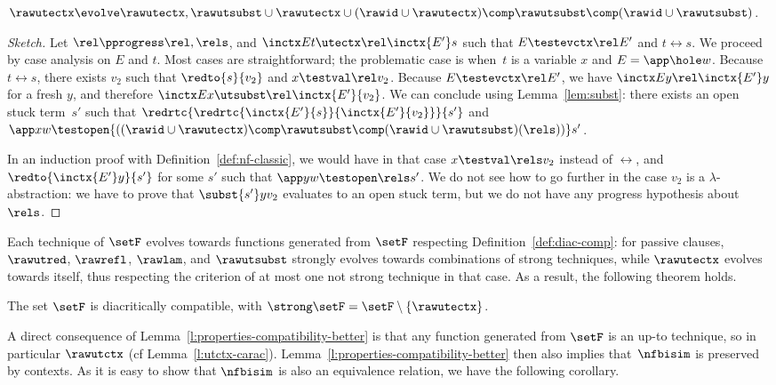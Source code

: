 \documentclass{lmcs}
\theoremstyle{defC}
\begin{document}
\begin{lem}%
  \label{l:app-lambda}
  $\rawutectx \evolve \rawutectx, \rawutsubst \cup \rawutectx \cup
  (\rawid \cup \rawutectx) \comp \rawutsubst \comp (\rawid \cup \rawutsubst)$.
\end{lem}

\begin{proof}[Sketch]
Let $\rel \pprogress \rel, \rels$, and $\inctx E t \utectx\rel
\inctx {E'} s$ such that $E \testevctx\rel E'$ and $t \rel s$.  We proceed by
case analysis on $E$ and $t$. Most cases are straightforward; the problematic
case is when~$t$ is a variable $x$ and $E = \app \hole w$. Because $t \rel s$,
there exists $v_2$ such that $\redto{s}{v_2}$ and $x \testval\rel v_2$. Because
$E \testevctx\rel E'$, we have $\inctx E y \rel \inctx {E'} y$ for a fresh $y$,
and therefore $\inctx E x \utsubst\rel \inctx {E'}{v_2}$. We can conclude using
Lemma~\ref{lem:subst}: there exists an open stuck term~$s'$ such that
$\redrtc{\redrtc{\inctx{E'}{s}}{\inctx{E'}{v_2}}}{s'}$ and $\app x w
\testopen{((\rawid \cup \rawutectx) \comp \rawutsubst \comp (\rawid \cup
  \rawutsubst)(\rels))} s'$.

In an induction proof with Definition~\ref{def:nf-classic}, we would have in
that case $x \testval\rels v_2$ instead of $\rel$, and $\redto {\inctx {E'}
  y}{s'}$ for some $s'$ such that $\app y w \testopen\rels s'$. We do not see
how to go further in the case $v_2$ is a $\lambda$-abstraction: we have to prove
that $\subst {s'} y {v_2}$ evaluates to an open stuck term, but we do not have
any progress hypothesis about $\rels$.
\end{proof}

Each technique of $\setF$ evolves towards functions generated from $\setF$
respecting Definition~\ref{def:diac-comp}: for passive clauses, $\rawutred$,
$\rawrefl$, $\rawlam$, and $\rawutsubst$ strongly evolves towards combinations
of strong techniques, while $\rawutectx$ evolves towards itself, thus respecting
the criterion of at most one not strong technique in that case. As a result, the
following theorem holds.

\begin{thm}%
  \label{t:compatible-lambda}
  The set $\setF$ is diacritically compatible, with $\strong \setF = \setF
  \setminus \{ \rawutectx \}$.
\end{thm}

A direct consequence of Lemma~\ref{l:properties-compatibility-better} is that
any function generated from $\setF$ is an up-to technique, so in particular
$\rawutctx$ (cf
Lemma~\ref{l:utctx-carac}). Lemma~\ref{l:properties-compatibility-better} then
also implies that~$\nfbisim$ is preserved by contexts. As it is easy to show
that $\nfbisim$ is also an equivalence relation, we have the following
corollary.
\end{document}
